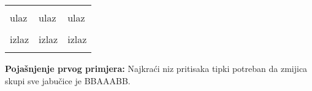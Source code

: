 \strut


\begin{center}
\fontfamily{\ttdefault}
\fontsize{10pt}{1em}
\selectfont
\begin{tabu}to 0.99\textwidth{|X[1]|X[1]|X[1]|}
\hline
& & \\ 
\rowfont{\fontsize{10pt}{1em}\bfseries}
ulaz & ulaz & ulaz\\
 &
 & 
 \\
\rowfont{\fontsize{10pt}{1em}\bfseries}
izlaz & izlaz & izlaz\\
 &
 & 
 \\
\hline
\end{tabu}
\end{center}

{
\fontsize{10pt}{1em}
\selectfont
\textbf{Pojašnjenje prvog primjera:} Najkraći niz pritisaka tipki potreban da zmijica skupi sve jabučice je BBAAABB. \\
}